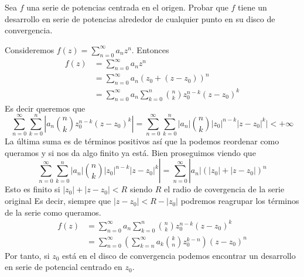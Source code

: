 \documentclass[twoside]{article}
\begin{document}
\newpage
\begin{ejercicio}{2}
Sea $f$ una serie de potencias centrada en el origen. Probar que $f$ tiene un desarrollo en serie de potencias alrededor de cualquier punto en su disco de convergencia.
\end{ejercicio}
\begin{solucion}
Consideremos $f(z)=\sum_{n=0}^\infty a_n z^n$. Entonces
\begin{align*}
f(z)&=\sum_{n=0}^\infty a_n z^n \\
&= \sum_{n=0}^\infty a_n (z_0 + (z-z_0))^n\\
&= \sum_{n=0}^\infty a_n \sum_{k=0}^n\binom{n}{k}z_0^{n-k}(z-z_0)^k
\end{align*}
Es decir queremos que
$$\sum_{n=0}^\infty \sum_{k=0}^n | a_n \binom{n}{k} z_0^{n-k} (z-z_0)^k | =
\sum_{n=0}^\infty \sum_{k=0}^n |a_n| \binom{n}{k} |z_0|^{n-k} |z-z_0|^k |< +\infty$$
La última suma es de términos positivos así que la podemos reordenar como queramos y si nos da algo finito ya está.  Bien proseguimos viendo que
$$\sum_{n=0}^\infty \sum_{k=0}^n |a_n| \binom{n}{k} |z_0|^{n-k} |z-z_0|^k |=
\sum_{n=0}^\infty  |a_n| (|z_0|+|z-z_0|)^n$$
Esto es finito si $|z_0|+|z-z_0| < R$ siendo $R$ el radio de covergencia de la serie original
Es decir, siempre que $|z-z_0|<R-|z_0|$ podremos reagrupar los términos de la serie como queramos.
\begin{align*}
f(z)&=\sum_{n=0}^\infty a_n \sum_{k=0}^n\binom{n}{k}z_0^{n-k}(z-z_0)^k\\
&=\sum_{n=0}^\infty \left(\sum_{k=n}^\infty a_k \binom{k}{n}z_0^{k-n}\right) (z-z_0)^n
\end{align*}
Por tanto, si $z_0$ está en el disco de convergencia podemos encontrar un desarrollo en serie de potencial centrado en $z_0$.
\end{solucion}
\newpage
\end{document}
